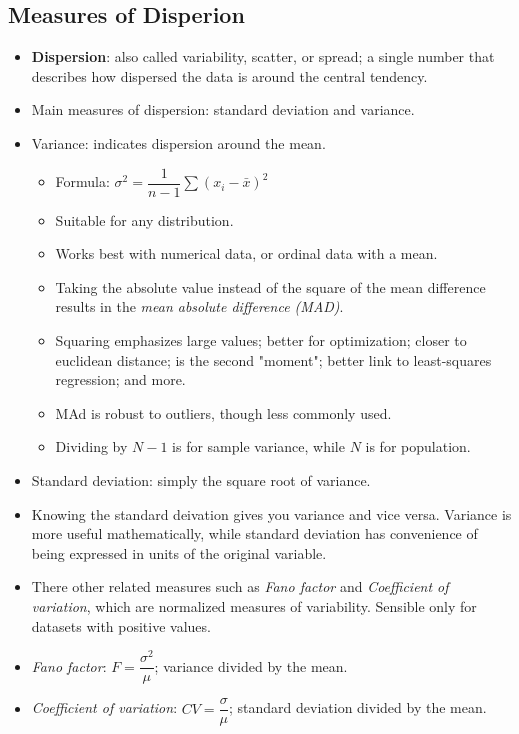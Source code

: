 \documentclass[12pt,a4paper]{article}
\begin{document}
\subsection{Measures of Disperion}
\begin{itemize}
    \item \textbf{Dispersion}: also called variability, scatter, or spread; a single number that describes how dispersed the data is around the central tendency. 
    \item Main measures of dispersion: {\color{o-Sun}standard deviation} and {\color{o-Sun}variance}.
    \item {\color{o-Sun}Variance}: indicates dispersion around the mean.
        \begin{itemize}
            \item Formula: {\color{o-Sun}\(\sigma^2=\dfrac{1}{n-1}\sum(x_i-\bar{x})^2\)}
            \item Suitable for any distribution. 
            \item Works best with numerical data, or ordinal data with a mean.
            \item Taking the absolute value instead of the square of the mean difference results in the \textit{mean absolute difference (MAD)}.
            \item Squaring emphasizes large values; better for optimization; closer to euclidean distance; is the second "moment"; better link to least-squares regression; and more.
            \item MAd is robust to outliers, though less commonly used. 
            \item Dividing by \(N-1\) is for sample variance, while \(N\) is for population.
        \end{itemize}
    \item {\color{o-Sun}Standard deviation}: simply the square root of variance. 
    \item Knowing the standard deivation gives you variance and vice versa. Variance is more useful mathematically, while standard deviation has convenience of being expressed in units of the original variable.
    \item There other related measures such as \textit{Fano factor} and \textit{Coefficient of variation}, which are normalized measures of variability. Sensible only for datasets with positive values. 
    \item \textit{Fano factor}: \(F = \dfrac{\sigma^2}{\mu}\); variance divided by the mean.
    \item \textit{Coefficient of variation}: \(CV= \dfrac{\sigma}{\mu}\); standard deviation divided by the mean. 
\end{itemize}
\end{document}
